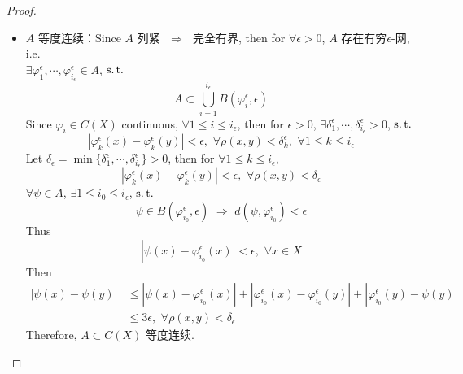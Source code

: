 \begin{thm}
\begin{proof}
\begin{enumerate}
\begin{itemize}
					\item $A$ 等度连续：Since $A$ 列紧 $\,\, \Rightarrow \,\,$ 完全有界, then for $\forall \epsilon > 0$, $A$ 存在有穷$\epsilon$-网, i.e. \\
					$\exists \varphi_{1}^\epsilon , \cdots , \varphi_{i_\epsilon}^\epsilon \in A$, $\operatorname{s.t.}$
					\[ A \subset \bigcup_{i = 1}^{i_\epsilon} B(\varphi_{i}^\epsilon , \epsilon) \]
					Since $\varphi_i \in C(X)$ continuous, $\forall 1 \leq i \leq i_\epsilon$, then for $\epsilon > 0$, $\exists \delta_{1}^\epsilon , \cdots , \delta_{i_\epsilon}^\epsilon > 0$, $\operatorname{s.t.}$
					\[ \left| \varphi_{k}^\epsilon(x) - \varphi_{k}^\epsilon(y) \right| < \epsilon , \,\, \forall \rho(x , y) < \delta_{k}^\epsilon , \,\, \forall 1 \leq k \leq i_\epsilon \]
					Let $\delta_\epsilon = \min \{ \delta_{1}^\epsilon , \cdots , \delta_{i_\epsilon}^\epsilon \} > 0$, then for $\forall 1 \leq k \leq i_\epsilon$, 
					\[ \left| \varphi_{k}^\epsilon(x) - \varphi_{k}^\epsilon(y) \right| < \epsilon , \,\, \forall \rho(x , y) < \delta_\epsilon \]
					$\forall \psi \in A$, $\exists 1 \leq i_0 \leq i_\epsilon$, $\operatorname{s.t.}$
					\[ \psi \in B(\varphi_{i_0}^\epsilon , \epsilon) \,\, \Rightarrow \,\, d(\psi , \varphi_{i_0}^\epsilon) < \epsilon \]
					Thus
					\[ \left| \psi(x) - \varphi_{i_0}^\epsilon (x) \right| < \epsilon , \,\, \forall x \in X \]
					Then
					\begin{align}
						\left| \psi(x) - \psi(y) \right| 
						&\leq \left| \psi(x) - \varphi_{i_0}^\epsilon(x) \right| + \left| \varphi_{i_0}^\epsilon(x) - \varphi_{i_0}^\epsilon(y) \right| + \left| \varphi_{i_0}^\epsilon(y) - \psi(y) \right| \\
						&\leq 3\epsilon , \,\, \forall \rho(x , y) < \delta_\epsilon
					\end{align}
					Therefore, $A \subset C(X)$ 等度连续.
				\end{itemize}
				
				\vspace{8em}
				

\end{enumerate}
\end{proof}
\end{thm}
